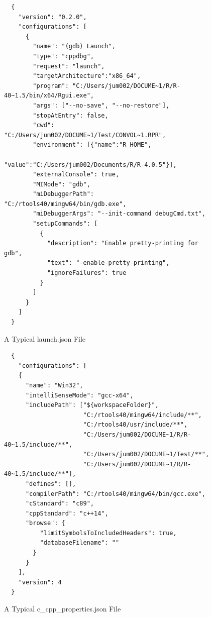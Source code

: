\begin{Schunk}
  \begin{figure}[htbp]
  {\centering}
  \begin{verbatim}
  {
    "version": "0.2.0",
    "configurations": [
      {
        "name": "(gdb) Launch",
        "type": "cppdbg",
        "request": "launch",
        "targetArchitecture":"x86_64",
        "program": "C:/Users/jum002/DOCUME~1/R/R-40~1.5/bin/x64/Rgui.exe",
        "args": ["--no-save", "--no-restore"],
        "stopAtEntry": false,
        "cwd": "C:/Users/jum002/DOCUME~1/Test/CONVOL~1.RPR",
        "environment": [{"name":"R_HOME",
                         "value":"C:/Users/jum002/Documents/R/R-4.0.5"}],
        "externalConsole": true,
        "MIMode": "gdb",
        "miDebuggerPath": "C:/rtools40/mingw64/bin/gdb.exe",
        "miDebuggerArgs": "--init-command debugCmd.txt",
        "setupCommands": [
          {
            "description": "Enable pretty-printing for gdb",
            "text": "-enable-pretty-printing",
            "ignoreFailures": true
          }
        ]
      }
    ]
  }
  \end{verbatim}
  \caption[A Typical launch.json File]{A Typical launch.json File}
  \label{fig:launchJSON}
  \end{figure}
\end{Schunk}
    
\begin{Schunk}
  \begin{figure}[htbp]
  {\centering}
  \begin{verbatim}
  {
    "configurations": [
    {
      "name": "Win32",
      "intelliSenseMode": "gcc-x64",
      "includePath": ["${workspaceFolder}",
                      "C:/rtools40/mingw64/include/**",
                      "C:/rtools40/usr/include/**",
                      "C:/Users/jum002/DOCUME~1/R/R-40~1.5/include/**",
                      "C:/Users/jum002/DOCUME~1/Test/**",
                      "C:/Users/jum002/DOCUME~1/R/R-40~1.5/include/**"],
      "defines": [],
      "compilerPath": "C:/rtools40/mingw64/bin/gcc.exe",
      "cStandard": "c89",
      "cppStandard": "c++14",
      "browse": {
          "limitSymbolsToIncludedHeaders": true,
          "databaseFilename": ""
        }
      }
    ],
    "version": 4
  }
  \end{verbatim}
  \caption[A Typical c\_cpp\_properties.json File]{A Typical c\_cpp\_properties.json File}
  \label{fig:CnCppProp}
  \end{figure}
\end{Schunk}
    
